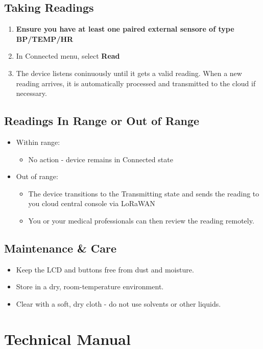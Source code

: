 \subsection{Taking Readings}
\begin{enumerate}
	\item \textbf{Ensure you have at least one paired external sensore of type BP/TEMP/HR}
	\item In Connected menu, select \textbf{Read}
	\item The device listens coninuously until it gets a valid reading. When a new reading arrives, it is automatically processed and transmitted to the cloud if necessary.
\end{enumerate}

\subsection{Readings In Range or Out of Range}
\begin{itemize}
	\item Within range:
	\begin{itemize}
		\item No action - device remains in Connected state
	\end{itemize}
\end{itemize}
\begin{itemize}
	\item Out of range:
	\begin{itemize}
		\item The device transitions to the Transmitting state and sends the reading to you cloud central console via LoRaWAN
		\item You or your medical professionals can then review the reading remotely.
	\end{itemize}
\end{itemize}

\subsection{Maintenance \& Care}
\begin{itemize}
	\item Keep the LCD and buttons free from dust and moisture.
	\item Store in a dry, room-temperature environment.
	\item Clear with a soft, dry cloth - do not use solvents or other liquids.
\end{itemize}

\newpage
\section*{Technical Manual}

